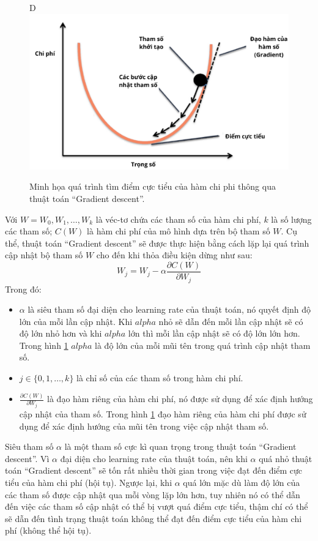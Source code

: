 \begin{figure}[h]
    \centering
D    \includegraphics[width=\textwidth]{images/Chapter2/GD.png}
    \caption{Minh họa quá trình tìm điểm cực tiểu của hàm chi phi thông qua thuật toán ``Gradient descent''.}
    \label{fig:2.4_GD}
\end{figure}

Với $W = {W_0, W_1, \dots, W_k}$ là véc-tơ chứa các tham số của hàm chi phí, $k$ là số lượng các tham số; $C(W)$ là hàm chi phí của mô hình dựa trên bộ tham số $W$. Cụ thể, thuật toán ``Gradient descent'' sẽ được thực hiện bằng cách lặp lại quá trình cập nhật bộ tham số $W$ cho đến khi thỏa điều kiện dừng như sau:
\begin{equation}
    W_j = W_j - \alpha \frac{\partial C(W)}{\partial W_j}
\end{equation}
Trong đó:
\begin{itemize}
    \item $\alpha$ là siêu tham số đại diện cho learning rate của thuật toán, nó quyết định độ lớn của mỗi lần cập nhật. Khi $alpha$ nhỏ sẽ dẫn đến mỗi lần cập nhật sẽ có độ lớn nhỏ hơn và khi $alpha$ lớn thì mỗi lần cập nhật sẽ có độ lớn lớn hơn. Trong hình \ref{fig:2.4_GD} $alpha$ là độ lớn của mỗi mũi tên trong quá trình cập nhật tham số.
    \item $j \in \{0,1,\dots,k\}$ là chỉ số của các tham số trong hàm chi phí.
    \item $\frac{\partial C(W)}{\partial W_j}$ là đạo hàm riêng của hàm chi phí, nó được sử dụng để xác định hướng cập nhật của tham số. Trong hình \ref{fig:2.4_GD} đạo hàm riêng của hàm chi phí được sử dụng để xác định hướng của mũi tên trong việc cập nhật tham số.
\end{itemize}

Siêu tham số $\alpha$ là một tham số cực kì quan trọng trong thuật toán ``Gradient descent''. Vì $\alpha$ đại diện cho learning rate của thuật toán, nên khi $\alpha$ quá nhỏ thuật toán ``Gradient descent'' sẽ tốn rất nhiều thời gian trong việc đạt đến điểm cực tiểu của hàm chi phí (hội tụ). Ngược lại, khi $\alpha$ quá lớn mặc dù làm độ lớn của các tham số được cập nhật qua mỗi vòng lặp lớn hơn, tuy nhiên nó có thể dẫn đến việc các tham số cập nhật có thể bị vượt quá điểm cực tiểu, thậm chí có thể sẽ dẫn đến tình trạng thuật toán không thể đạt đến điểm cực tiểu của hàm chi phí (không thể hội tụ).